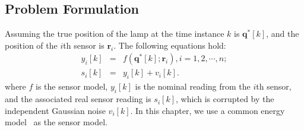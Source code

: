 %
%



\subsection{Problem Formulation}\label{s:problemformulation}

    Assuming the true position of the lamp at the time instance $k$ is $\mathbf{q^\ast}[k]$, and the position of the $i$th sensor is $\mathbf{r}_i$. The following equations hold:
\begin{eqnarray*}
    y_i[k] &=& f(\mathbf{q^\ast}[k]; \mathbf{r}_i), i=1,2,\cdots,n ;\label{e:yfq} \\
    s_i[k] &=& y_i[k]+v_i[k].\label{e:syv}
\end{eqnarray*}
where $f$ is the sensor model, $y_i[k]$ is the nominal reading from the $i$th sensor, and the associated real sensor reading is $s_i[k]$, which is corrupted by the independent Gaussian noise $v_i[k]$. In this chapter, we use a common energy model~\cite{ArandaOptSensorPlacement05} as the sensor model.


